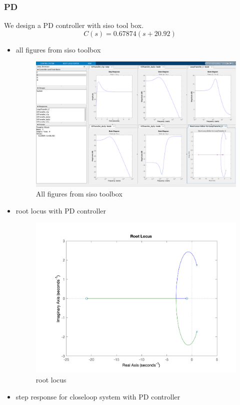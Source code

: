 \subsubsection{PD}
We design a PD controller with siso tool box.
$$
C(s) = 0.67874 (s+20.92)
$$
\begin{itemize}
	\item all figures from siso toolbox
	\begin{figure}[H]
		\caption{All figures from siso toolbox}
		\centering
		\includegraphics[width=16cm]{../Figure/Q1/Q1_b/PD/siso_all.png}
	\end{figure}
	\newpage
	\item root locus with PD controller
	\begin{figure}[H]
		\caption{root locus}
		\centering
		\includegraphics[width=12cm]{../Figure/Q1/Q1_b/PD/rlocus.png}
	\end{figure}
	\item step response for closeloop system with PD controller

\end{itemize}
